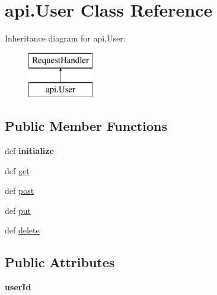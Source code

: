 \hypertarget{classapi_1_1_user}{\section{api.\-User Class Reference}
\label{classapi_1_1_user}
}
Inheritance diagram for api.\-User\-:\begin{figure}[H]
\begin{center}
\leavevmode
\includegraphics[height=2.000000cm]{classapi_1_1_user}
\end{center}
\end{figure}
\subsection*{Public Member Functions}
\begin{DoxyCompactItemize}
\item 
\hypertarget{classapi_1_1_user_a0f2cf0a3d4c5d606953358cb92a2b166}{def {\bfseries initialize}}\label{classapi_1_1_user_a0f2cf0a3d4c5d606953358cb92a2b166}

\item 
def \hyperlink{classapi_1_1_user_afd5bb645380fe6192ec6068fdcdda96e}{get}
\item 
def \hyperlink{classapi_1_1_user_a9365de26fbc9d590fce399ddf775a28f}{post}
\item 
def \hyperlink{classapi_1_1_user_aefffd1aa5d149b091f779b3222748fb5}{put}
\item 
def \hyperlink{classapi_1_1_user_a2868600f2d73a2e59e4a814205e5ae6e}{delete}
\end{DoxyCompactItemize}
\subsection*{Public Attributes}
\begin{DoxyCompactItemize}
\item 
\hypertarget{classapi_1_1_user_ad10ba6df28dbfe8546f24226c1ca28f6}{{\bfseries user\-Id}}\label{classapi_1_1_user_ad10ba6df28dbfe8546f24226c1ca28f6}

\end{DoxyCompactItemize}


